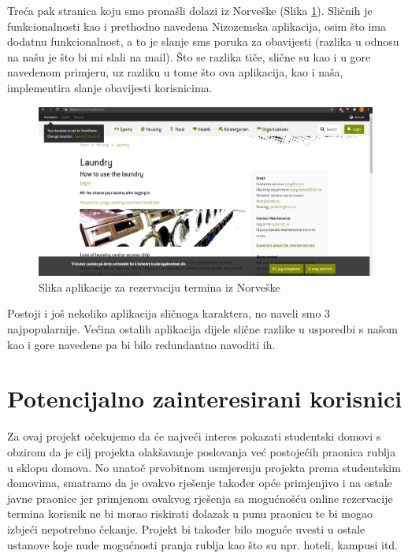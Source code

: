 			{Treća pak stranica koju smo pronašli dolazi iz Norveške (Slika  \ref{fig:sit}). Sličnih je funkcionalnosti kao i prethodno
			navedena Nizozemska aplikacija, osim što ima dodatnu funkcionalnost, a to je slanje sms poruka za
			obavijesti (razlika u odnosu na našu je što bi mi slali na mail). Što se razlika tiče, slične su kao i u gore
			navedenom primjeru, uz razliku u tome što ova aplikacija, kao i naša, implementira slanje obavijesti
			korisnicima. }
		
			\begin{figure}[H]
				\includegraphics[width=.9\linewidth]{slike/SIT.PNG}
				\centering
				\caption{Slika aplikacije za rezervaciju termina iz Norveške}
				\label{fig:sit}
			\end{figure}
		
			{Postoji i još nekoliko aplikacija sličnoga karaktera, no naveli smo 3 najpopularnije. Većina ostalih
			aplikacija dijele slične razlike u usporedbi s našom kao i gore navedene pa bi bilo redundantno navoditi
			ih.}
			
		\section{Potencijalno zainteresirani korisnici}
			
			{Za ovaj projekt očekujemo da će najveći interes pokazati studentski domovi s obzirom da je cilj projekta
			olakšavanje poslovanja već postojećih praonica rublja u sklopu domova. No unatoč prvobitnom
			usmjerenju projekta prema studentskim domovima, smatramo da je ovakvo rješenje također opće
			primjenjivo i na ostale javne praonice jer primjenom ovakvog rješenja sa mogućnošću online rezervacije
			termina korisnik ne bi morao riskirati dolazak u punu praonicu te bi mogao izbjeći nepotrebno čekanje.
			Projekt bi također bilo moguće uvesti u ostale ustanove koje nude mogućnosti pranja rublja kao što su
			npr. hoteli, kampusi itd.}	
		
